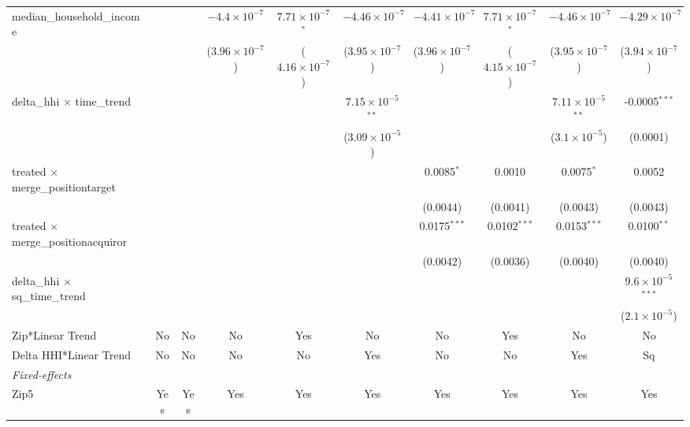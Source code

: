 \begin{table}[H]
{\begin{tabular}{lccccccccc}
 median\_household\_income&   &    & $-4.4\times 10^{-7}$ & $7.71\times 10^{-7}$$^{*}$ & $-4.46\times 10^{-7}$ & $-4.41\times 10^{-7}$ & $7.71\times 10^{-7}$$^{*}$ & $-4.46\times 10^{-7}$ & $-4.29\times 10^{-7}$\\ 

   &   &    & ($3.96\times 10^{-7}$) & ($4.16\times 10^{-7}$) & ($3.95\times 10^{-7}$) & ($3.96\times 10^{-7}$) & ($4.15\times 10^{-7}$) & ($3.95\times 10^{-7}$) & ($3.94\times 10^{-7}$)\\ 

 delta\_hhi $\times $ time\_trend&   &    &    &    & $7.15\times 10^{-5}$$^{**}$ &    &    & $7.11\times 10^{-5}$$^{**}$ & -0.0005$^{***}$\\ 

   &   &    &    &    & ($3.09\times 10^{-5}$) &    &    & ($3.1\times 10^{-5}$) & (0.0001)\\ 

 treated $\times $ merge\_positiontarget&   &    &    &    &    & 0.0085$^{*}$ & 0.0010 & 0.0075$^{*}$ & 0.0052\\ 

   &   &    &    &    &    & (0.0044) & (0.0041) & (0.0043) & (0.0043)\\ 

 treated $\times $ merge\_positionacquiror&   &    &    &    &    & 0.0175$^{***}$ & 0.0102$^{***}$ & 0.0153$^{***}$ & 0.0100$^{**}$\\ 

   &   &    &    &    &    & (0.0042) & (0.0036) & (0.0040) & (0.0040)\\ 

 delta\_hhi $\times $ sq\_time\_trend&   &    &    &    &    &    &    &    & $9.6\times 10^{-5}$$^{***}$\\ 

   &   &    &    &    &    &    &    &    & ($2.1\times 10^{-5}$)\\ 

 Zip*Linear Trend & No & No & No & Yes & No & No & Yes & No & No\\ 

 Delta HHI*Linear Trend & No & No & No & No & Yes & No & No & Yes & Sq\\ 

 \midrule \emph{Fixed-effects}&   &   &   &   &   &   &   &   &  \\ 

 Zip5 & Yes & Yes & Yes & Yes & Yes & Yes & Yes & Yes & Yes\\ 


\end{tabular}}
\end{table}
